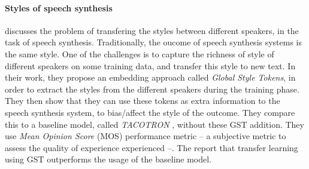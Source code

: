     \paragraph{Styles of speech synthesis}
    \citep{wang2018style} discusses the problem of transfering the styles between different speakers, in the task of speech synthesis. Traditionally, the oucome of speech synthesis systems is the same style. One of the challenges is to capture the richness of style of different speakers on some training data, and transfer this style to new text. In their work, they propose an embedding approach called \textit{Global Style Tokens}, in order to extract the styles from the different speakers during the training phase. They then show that they can use these tokens as extra information to the speech synthesis system, to bias/affect the style of the outcome.
    They compare this to a baseline model, called \textit{TACOTRON} \citep{wang2017tacotron}, without these GST addition. They use \textit{Mean Opinion Score} (MOS) performance metric -- a subjective metric to assess the quality of experience experienced --. The report that transfer learning using GST outperforms the usage of the baseline model.


